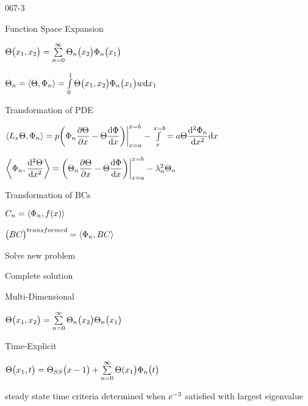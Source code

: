 \begin{mitframe}{067-3}
 	\begin{listone}
    	\item Function Space Expansion
        \begin{listtwo}
        	\item $\dimltemp\big(\disp_1,\disp_2\big)=\sum\limits_{n=0}^{\infty}\dimltemp_n\big(\disp_2\big)\pot_n\big(\disp_1\big)$
            \item $\dimltemp_n=\langle\dimltemp,\pot_n\rangle=\int\limits_{\init}^1\dimltemp\big(\disp_1,\disp_2\big)\pot_n\big(\disp_1\big)w\mathrm{d}\disp_1$
        \end{listtwo} 
		\item Transformation of PDE
        	\begin{listtwo}
            	\item $\langle\length_{\disp}\dimltemp,\pot_n\rangle=p\bigg(\pot_n\dfrac{\partial\dimltemp}{\partial\disp}-\dimltemp\dfrac{\mathrm{d}\pot}{\mathrm{d}\disp}\bigg)\bigg|_{\disp=\activity}^{\disp=b}-\int\limits^{\disp=b}_{\disp}=\activity\dimltemp\dfrac{\mathrm{d}^2\pot_n}{\mathrm{d}\disp^2}\mathrm{d}\disp$    
            \end{listtwo}
    	\item $\bigg\langle\pot_n,\dfrac{\mathrm{d}^2\dimltemp}{\mathrm{d}\disp^2}\bigg\rangle=\bigg(\dimltemp_n\dfrac{\partial\dimltemp}{\partial\disp}-\dimltemp\dfrac{\mathrm{d}\pot}{\mathrm{d}\disp}\bigg)\bigg|_{\disp=\activity}^{\disp=b}-\lambda^2_n\dimltemp_n$
        \item Transformation of BCs
        \item $\conc_n=\langle\pot_n,\fug(\disp)\rangle$
        \item $\big(\exergy\conc\big)^{transformed}=\langle\pot_n, \exergy\conc\rangle$
        \item Solve new problem
        \item Complete solution
        \item Multi-Dimensional
        \item $\dimltemp\big(\disp_1, \disp_2\big)=\sum\limits_{n=0}^{\infty}\dimltemp_n\big(\disp_2\big)\dimltemp_n\big(\disp_1\big)$
        \item Time-Explicit
        \item $\dimltemp\big(\disp_1,\timet\big)=\dimltemp_{\entropy\entropy}\big(\disp-1\big)+\sum\limits_{n=0}^{\infty}\dimltemp(\disp_1\big)\pot_n\big(\timet\big)$
        \item steady state time criteria determined when $\e^{-3}$ satisfied with largest eigenvalue
        
        
        \end{listone}
\end{mitframe}